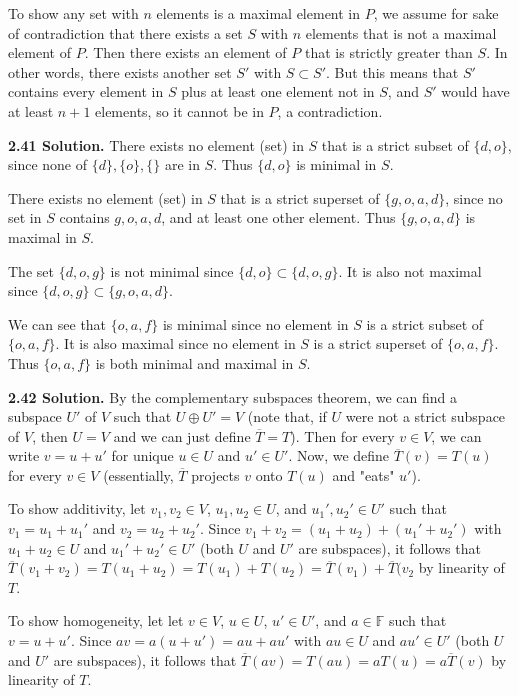 To show any set with $n$ elements is a maximal element in $P$, we assume for sake of contradiction that there exists a set $S$ with $n$ elements that is not a maximal element of $P$. Then there exists an element of $P$ that is strictly greater than $S$. In other words, there exists another set $S'$ with $S\subset S'$. But this means that $S'$ contains every element in $S$ plus at least one element not in $S$, and $S'$ would have at least $n+1$ elements, so it cannot be in $P$, a contradiction.

\textbf{2.41 Solution.} There exists no element (set) in $S$ that is a strict subset of $\{d,o\}$, since none of $\{d\}, \{o\}, \{\}$ are in $S$. Thus $\{d,o\}$ is minimal in $S$.

There exists no element (set) in $S$ that is a strict superset of $\{g,o,a,d\}$, since no set in $S$ contains $g,o,a,d$, and at least one other element. Thus $\{g,o,a,d\}$ is maximal in $S$.

The set $\{d,o,g\}$ is not minimal since $\{d,o\}\subset\{d,o,g\}$. It is also not maximal since $\{d,o,g\}\subset\{g,o,a,d\}$.

We can see that $\{o,a,f\}$ is minimal since no element in $S$ is a strict subset of $\{o,a,f\}$. It is also maximal since no element in $S$ is a strict superset of $\{o,a,f\}$. Thus $\{o,a,f\}$ is both minimal and maximal in $S$.

\textbf{2.42 Solution.} By the complementary subspaces theorem, we can find a subspace $U'$ of $V$ such that $U\oplus U' = V$ (note that, if $U$ were not a strict subspace of $V$, then $U = V$ and we can just define $\overline{T} = T$). Then for every $v\in V$, we can write $v = u + u'$ for unique $u\in U$ and $u'\in U'$. Now, we define $\overline{T}(v) = T(u)$ for every $v\in V$ (essentially, $\overline{T}$ projects $v$ onto $T(u)$ and "eats" $u'$). 

To show additivity, let $v_1,v_2\in V$, $u_1,u_2\in U$, and $u_1',u_2'\in U'$ such that $v_1 = u_1 + u_1'$ and $v_2 = u_2 + u_2'$. Since $v_1 + v_2 = (u_1 + u_2) + (u_1' + u_2')$ with $u_1 + u_2\in U$ and $u_1' + u_2'\in U'$ (both $U$ and $U'$ are subspaces), it follows that $\overline{T}(v_1+v_2) = T(u_1 + u_2) = T(u_1) + T(u_2) = \overline{T}(v_1) + \overline{T}(v_2$ by linearity of $T$.

To show homogeneity, let let $v\in V$, $u\in U$, $u'\in U'$, and $a\in\mathbb{F}$ such that $v = u + u'$. Since $av = a(u + u') = au + au'$ with $au\in U$ and $au'\in U'$ (both $U$ and $U'$ are subspaces), it follows that $\overline{T}(av) = T(au) = aT(u) = a\overline{T}(v)$ by linearity of $T$.

